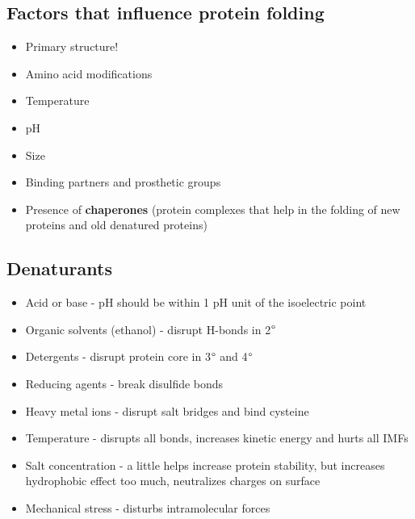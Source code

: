 \documentclass[letterpaper, 12pt]{article}
\begin{document}
\subsection*{Factors that influence protein folding}

\begin{itemize}
\item Primary structure!
\item Amino acid modifications
\item Temperature
\item pH
\item Size
\item Binding partners and prosthetic groups
\item Presence of \textbf{chaperones} (protein complexes that help in the folding of new proteins and old denatured proteins)
\end{itemize}

\subsection*{Denaturants}

\begin{itemize}
\item Acid or base - pH should be within 1 pH unit of the isoelectric point
\item Organic solvents (ethanol) - disrupt H-bonds in 2$\degree$
\item Detergents - disrupt protein core in 3$\degree$ and 4$\degree$
\item Reducing agents - break disulfide bonds
\item Heavy metal ions - disrupt salt bridges and bind cysteine
\item Temperature - disrupts all bonds, increases kinetic energy and hurts all IMFs
\item Salt concentration - a little helps increase protein stability, but increases hydrophobic effect too much, neutralizes charges on surface
\item Mechanical stress - disturbs intramolecular forces
\end{itemize}
\end{document}
